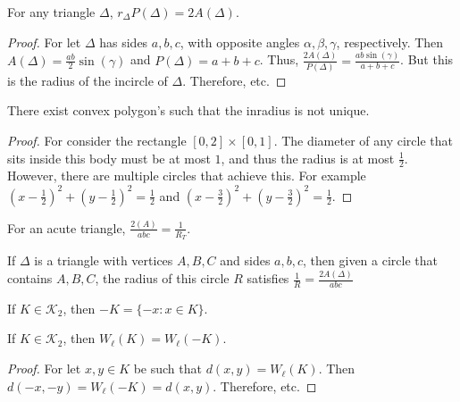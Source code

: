 \documentclass[crop=false,class=book,oneside]{standalone}
\begin{document}
            \begin{theorem}
            For any triangle $\Delta$, $r_{\Delta}P(\Delta) = 2A(\Delta)$.
            \end{theorem}
            \begin{proof}
            For let $\Delta$ has sides $a,b,c$, with opposite angles $\alpha, \beta, \gamma$, respectively. Then $A(\Delta) = \frac{ab}{2}\sin(\gamma)$ and $P(\Delta)=a+b+c$. Thus, $\frac{2A(\Delta)}{P(\Delta)} = \frac{ab\sin(\gamma)}{a+b+c}$. But this is the radius of the incircle of $\Delta$. Therefore, etc.
            \end{proof}
            \begin{theorem}
            \end{theorem}
            \begin{theorem}
            There exist convex polygon's such that the inradius is not unique.
            \end{theorem}
            \begin{proof}
            For consider the rectangle $[0,2]\times [0,1]$. The diameter of any circle that sits inside this body must be at most $1$, and thus the radius is at most $\frac{1}{2}$. However, there are multiple circles that achieve this. For example $(x-\frac{1}{2})^2+(y-\frac{1}{2})^2=\frac{1}{2}$ and $(x-\frac{3}{2})^2+(y-\frac{3}{2})^2=\frac{1}{2}$.
            \end{proof}
            \begin{theorem}
            For an acute triangle, $\frac{2(A)}{abc} = \frac{1}{R_T}$.
            \end{theorem}
            \begin{theorem}
            If $\Delta$ is a triangle with vertices $A,B,C$ and sides $a,b,c$, then given a circle that contains $A,B,C$, the radius of this circle $R$ satisfies $\frac{1}{R} =\frac{2A(\Delta)}{abc}$
            \end{theorem}
            \begin{definition}
            If $K\in \mathscr{K}_2$, then $-K = \{-x:x\in K\}$.
            \end{definition}
            \begin{theorem}
            If $K\in \mathscr{K}_2$, then $W_{\ell}(K) = W_{\ell}(-K)$.
            \end{theorem}
            \begin{proof}
            For let $x,y\in K$ be such that $d(x,y) = W_{\ell}(K)$. Then $d(-x,-y) = W_{\ell}(-K) = d(x,y)$. Therefore, etc.
            \end{proof}
\end{document}
